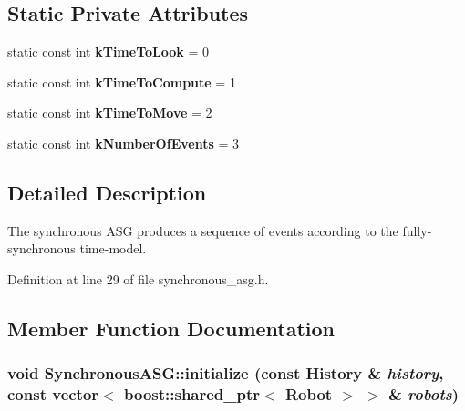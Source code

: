 \subsection*{Static Private Attributes}
\begin{CompactItemize}
\item 
\hypertarget{class_synchronous_a_s_g_9127128e60da48154da2e3ef6e8ced85}{
static const int \textbf{kTimeToLook} = 0}
\label{class_synchronous_a_s_g_9127128e60da48154da2e3ef6e8ced85}

\item 
\hypertarget{class_synchronous_a_s_g_87b700024cffa28e67b05abc5fdbab46}{
static const int \textbf{kTimeToCompute} = 1}
\label{class_synchronous_a_s_g_87b700024cffa28e67b05abc5fdbab46}

\item 
\hypertarget{class_synchronous_a_s_g_c9d1ea6a8943c9308c0e238fd1d379ef}{
static const int \textbf{kTimeToMove} = 2}
\label{class_synchronous_a_s_g_c9d1ea6a8943c9308c0e238fd1d379ef}

\item 
\hypertarget{class_synchronous_a_s_g_f5d8677345914ed5c915e331e6796cd8}{
static const int \textbf{kNumberOfEvents} = 3}
\label{class_synchronous_a_s_g_f5d8677345914ed5c915e331e6796cd8}

\end{CompactItemize}


\subsection{Detailed Description}
The synchronous ASG produces a sequence of events according to the fully-synchronous time-model. 

Definition at line 29 of file synchronous\_\-asg.h.

\subsection{Member Function Documentation}
\hypertarget{class_synchronous_a_s_g_05acba7c914bdb8b4080ef763c092993}{
\subsubsection[initialize]{\setlength{\rightskip}{0pt plus 5cm}void SynchronousASG::initialize (const {\bf History} \& {\em history}, \/  const vector$<$ boost::shared\_\-ptr$<$ Robot $>$ $>$ \& {\em robots})}}
\label{class_synchronous_a_s_g_05acba7c914bdb8b4080ef763c092993}


